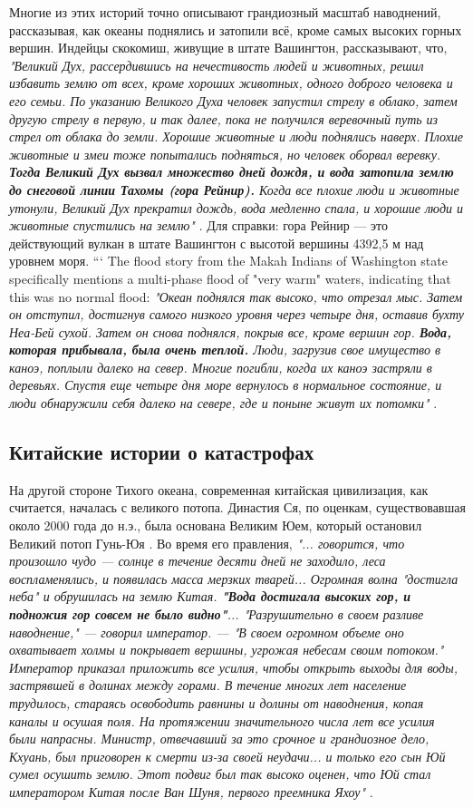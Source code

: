 \documentclass[10pt,twocolumn,letterpaper]{article}
\begin{document}
Многие из этих историй точно описывают грандиозный масштаб наводнений, рассказывая, как океаны поднялись и затопили всё, кроме самых высоких горных вершин. Индейцы скокомиш, живущие в штате Вашингтон, рассказывают, что, \textit{"Великий Дух, рассердившись на нечестивость людей и животных, решил избавить землю от всех, кроме хороших животных, одного доброго человека и его семьи. По указанию Великого Духа человек запустил стрелу в облако, затем другую стрелу в первую, и так далее, пока не получился веревочный путь из стрел от облака до земли. Хорошие животные и люди поднялись наверх. Плохие животные и змеи тоже попытались подняться, но человек оборвал веревку. \textbf{Тогда Великий Дух вызвал множество дней дождя, и вода затопила землю до снеговой линии Тахомы (гора Рейнир).} Когда все плохие люди и животные утонули, Великий Дух прекратил дождь, вода медленно спала, и хорошие люди и животные спустились на землю"} \cite{3}. Для справки: гора Рейнир — это действующий вулкан в штате Вашингтон с высотой вершины 4392,5 м над уровнем моря.
```
The flood story from the Makah Indians of Washington state specifically mentions a multi-phase flood of "very warm" waters, indicating that this was no normal flood: \textit{"Океан поднялся так высоко, что отрезал мыс. Затем он отступил, достигнув самого низкого уровня через четыре дня, оставив бухту Неа-Бей сухой. Затем он снова поднялся, покрыв все, кроме вершин гор. \textbf{Вода, которая прибывала, была очень теплой.} Люди, загрузив свое имущество в каноэ, поплыли далеко на север. Многие погибли, когда их каноэ застряли в деревьях. Спустя еще четыре дня море вернулось в нормальное состояние, и люди обнаружили себя далеко на севере, где и поныне живут их потомки"} \cite{3}.

\subsection{Китайские истории о катастрофах}

На другой стороне Тихого океана, современная китайская цивилизация, как считается, началась с великого потопа. Династия Ся, по оценкам, существовавшая около 2000 года до н.э., была основана Великим Юем, который остановил Великий потоп Гунь-Юя \cite{6}. Во время его правления, \textit{"... говорится, что произошло чудо — солнце в течение десяти дней не заходило, леса воспламенялись, и появилась масса мерзких тварей... Огромная волна "достигла неба" и обрушилась на землю Китая. \textbf{"Вода достигала высоких гор, и подножия гор совсем не было видно"}... "Разрушительно в своем разливе наводнение," — говорил император. — "В своем огромном объеме оно охватывает холмы и покрывает вершины, угрожая небесам своим потоком." Император приказал приложить все усилия, чтобы открыть выходы для воды, застрявшей в долинах между горами. В течение многих лет население трудилось, стараясь освободить равнины и долины от наводнения, копая каналы и осушая поля. На протяжении значительного числа лет все усилия были напрасны. Министр, отвечавший за это срочное и грандиозное дело, Кхуань, был приговорен к смерти из-за своей неудачи... и только его сын Юй сумел осушить землю. Этот подвиг был так высоко оценен, что Юй стал императором Китая после Ван Шуня, первого преемника Яхоу"} \cite{5}.
\end{document}
